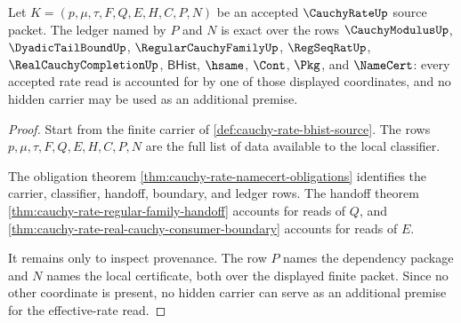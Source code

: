 \begin{theorem}
\label{thm:cauchy-rate-ledger-exactness}
Let $K=(p,\mu,\tau,F,Q,E,H,C,P,N)$ be an accepted $\CauchyRateUp$ source packet. The ledger named by $P$ and $N$ is exact over the rows $\CauchyModulusUp$, $\DyadicTailBoundUp$, $\RegularCauchyFamilyUp$, $\RegSeqRatUp$, $\RealCauchyCompletionUp$, $\mathsf{BHist}$, $\hsame$, $\Cont$, $\Pkg$, and $\NameCert$: every accepted rate read is accounted for by one of those displayed coordinates, and no hidden carrier may be used as an additional premise.
\end{theorem}
\begin{proof}
Start from the finite carrier of \autoref{def:cauchy-rate-bhist-source}. The rows $p,\mu,\tau,F,Q,E,H,C,P,N$ are the full list of data available to the local classifier.

The obligation theorem \autoref{thm:cauchy-rate-namecert-obligations} identifies the carrier, classifier, handoff, boundary, and ledger rows. The handoff theorem \autoref{thm:cauchy-rate-regular-family-handoff} accounts for reads of $Q$, and \autoref{thm:cauchy-rate-real-cauchy-consumer-boundary} accounts for reads of $E$.

It remains only to inspect provenance. The row $P$ names the dependency package and $N$ names the local certificate, both over the displayed finite packet. Since no other coordinate is present, no hidden carrier can serve as an additional premise for the effective-rate read.
\end{proof}


